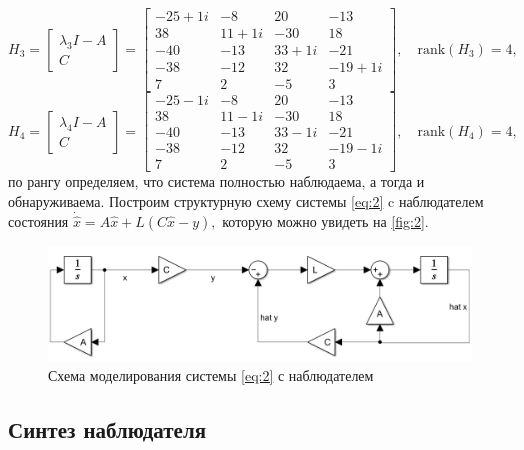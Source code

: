 \begin{equation*}
H_3 = \begin{bmatrix}
    \lambda_3 I - A \\ C
    \end{bmatrix} =
\begin{bmatrix}
-25 + 1i & -8 & 20 & -13 \\
38 & 11 + 1i & -30 & 18 \\
-40 & -13 & 33 + 1i & -21 \\
-38 & -12 & 32 & -19 + 1i \\
7 & 2 & -5 & 3
\end{bmatrix},\quad
\text{rank}(H_3) = 4,
\end{equation*}
\begin{equation*}
H_4 = \begin{bmatrix}
    \lambda_4 I - A \\ C
    \end{bmatrix} =
\begin{bmatrix}
-25 - 1i & -8 & 20 & -13 \\
38 & 11 - 1i & -30 & 18 \\
-40 & -13 & 33 - 1i & -21 \\
-38 & -12 & 32 & -19 - 1i \\
7 & 2 & -5 & 3
\end{bmatrix},\quad
\text{rank}(H_4) = 4,
\end{equation*}
по рангу определяем, что система полностью наблюдаема, а тогда и обнаруживаема.
Построим структурную схему системы \ref{eq:2} c наблюдателем состояния
$\dot{\hat x}=A\hat x+L(C\hat x - y),$ которую можно увидеть на \autoref{fig:2}.

\begin{figure}[H]
    \centering
    \includegraphics[width=\linewidth]{figs/task2_slx.png}
    \caption{Схема моделирования системы \ref{eq:2} с наблюдателем}
    \label{fig:2}
\end{figure}

\subsection{Синтез наблюдателя}

